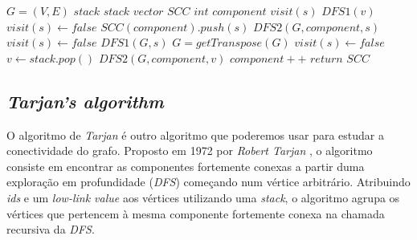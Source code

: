 \documentclass[12pt,a4paper]{report}
\begin{document}
		\begin{center}
			\begin{algorithmic}[1]
				\State $G = (V, E)$
				\State $stack$ $stack$
				\State $vector$ $SCC$
				\State $int$ $component$
				\newline
					\State $visit(s)$
							\State $DFS1(v)$
						\EndIf
					\EndFor
				\EndFunction
				\newline
					\State $visit(s) \leftarrow false$
					\State $SCC(component).push(s)$
							\State $DFS2(G, component, s)$
						\EndIf
					\EndFor
				\EndFunction
				\newline
						\State $visit(s) \leftarrow false$
					\EndFor
						\State $DFS1(G,s)$
					\EndFor
					\State $G = getTranspose(G)$
						\State $visit(s) \leftarrow false$
					\EndFor
						\State $v \leftarrow stack.pop()$
							\State $DFS2(G, component, v)$
						\EndIf
						\State $component++$
					\EndWhile
					\State $return$ $SCC$
				\EndFunction
			\end{algorithmic}
		\end{center}


		\subsection{\textit{Tarjan's algorithm}}
		\label{algo:tarjan}
		O algoritmo de \textit{Tarjan} é outro algoritmo que poderemos usar para estudar a conectividade do grafo. Proposto em 1972 por \textit{Robert Tarjan} \cite{tarjan}, o algoritmo consiste em encontrar as componentes fortemente conexas a partir duma exploração em profundidade (\textit{DFS}) começando num vértice arbitrário. Atribuindo \textit{ids} e um \textit{low-link value} aos vértices utilizando uma \textit{stack}, o algoritmo agrupa os vértices que pertencem à mesma componente fortemente conexa na chamada recursiva da \textit{DFS}.
\end{document}
